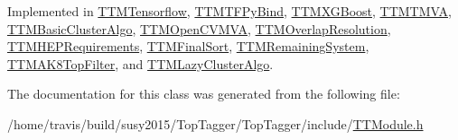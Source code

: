 Implemented in \hyperlink{classTTMTensorflow_afe5cdab757948e8eb2713fab0385869b}{T\-T\-M\-Tensorflow}, \hyperlink{classTTMTFPyBind_a5815a77655f5500c117cf71269105242}{T\-T\-M\-T\-F\-Py\-Bind}, \hyperlink{classTTMXGBoost_afd522be937c0e1c8226c83cc6888c666}{T\-T\-M\-X\-G\-Boost}, \hyperlink{classTTMTMVA_a640584674f072cb893685845080c5eb9}{T\-T\-M\-T\-M\-V\-A}, \hyperlink{classTTMBasicClusterAlgo_ae1d464bf1db5762318766d109c843932}{T\-T\-M\-Basic\-Cluster\-Algo}, \hyperlink{classTTMOpenCVMVA_af51d1bf351304ef8c6e732763d58c433}{T\-T\-M\-Open\-C\-V\-M\-V\-A}, \hyperlink{classTTMOverlapResolution_a4099ee72e105acbcca10078068775bef}{T\-T\-M\-Overlap\-Resolution}, \hyperlink{classTTMHEPRequirements_a5815a6c66595320c1d0f0f006dd67a4d}{T\-T\-M\-H\-E\-P\-Requirements}, \hyperlink{classTTMFinalSort_ae4a9797de31364e116fe4b99c57c4afd}{T\-T\-M\-Final\-Sort}, \hyperlink{classTTMRemainingSystem_ab9f2abe56c30f34c2319f752c403fb09}{T\-T\-M\-Remaining\-System}, \hyperlink{classTTMAK8TopFilter_a28a8fcd8a829caae32b2a106037d3a6f}{T\-T\-M\-A\-K8\-Top\-Filter}, and \hyperlink{classTTMLazyClusterAlgo_a1ec9281c5d6c04ae788b72ca2884d870}{T\-T\-M\-Lazy\-Cluster\-Algo}.



The documentation for this class was generated from the following file\-:\begin{DoxyCompactItemize}
\item 
/home/travis/build/susy2015/\-Top\-Tagger/\-Top\-Tagger/include/\hyperlink{TTModule_8h}{T\-T\-Module.\-h}\end{DoxyCompactItemize}
